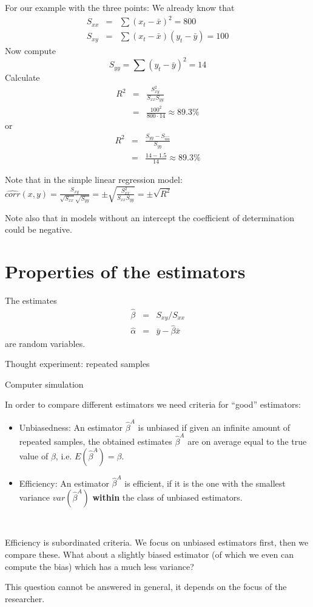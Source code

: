 \documentclass{article}
\begin{document}
For our example with the three points:
We already know that%
\begin{eqnarray*}
	S_{xx} &=&\sum \left( x_{t}-\bar{x}\right) ^{2}=800 \\
	S_{xy} &=&\sum \left( x_{t}-\bar{x}\right) \left( y_{t}-\bar{y}\right) =100
\end{eqnarray*}%
Now compute%
\[
S_{yy}=\sum \left( y_{t}-\bar{y}\right) ^{2}=14 
\]%
Calculate%
\begin{eqnarray*}
	R^{2} &=&\frac{S_{xy}^{2}}{S_{xx}S_{yy}} \\
	&=&\frac{100^{2}}{800\cdot 14}\approx 89.3\%
\end{eqnarray*}%
or%
\begin{eqnarray*}
	R^{2} &=&\frac{S_{yy}-S_{\hat{u}\hat{u}}}{S_{yy}} \\
	&=&\frac{14-1.5}{14}\approx 89.3\%
\end{eqnarray*}

Note that in the simple linear regression model: $\widehat{corr}(x,y)=\frac{S_{xy}}{\sqrt{S_{xx}}\sqrt{S_{yy}}}= \pm \sqrt{\frac{S_{xx}^2}{S_{xx}S_{yy}}} = \pm \sqrt{R^2}$

Note also that in models without an intercept the coefficient of determination could be negative.
\section{Properties of the estimators}

The estimates
\begin{eqnarray*}
\hat{\beta} &=&S_{xy}/S_{xx} \\
\hat{\alpha} &=&\bar{y}-\hat{\beta}\bar{x}
\end{eqnarray*}
are random variables.

Thought experiment: repeated samples

Computer simulation 

In order to compare different estimators we need criteria for \enquote{good} estimators:
\begin{itemize}
	\item Unbiasedness: An estimator $\hat{\beta}^A$ is unbiased if given an infinite amount of repeated samples, the obtained estimates $\hat{\beta}^A$ are on average equal to the true value of $\beta$, i.e. $E(\hat{\beta}^A)=\beta$.
	\item Efficiency: An estimator $\hat{\beta}^A$ is efficient, if it is the one with the smallest variance $var(\hat{\beta}^A)$ \textbf{within} the class of unbiased estimators.
\end{itemize}
\begin{center}
	\\
		
\end{center}
Efficiency is subordinated criteria. We focus on unbiased estimators first, then we compare these. What about a slightly biased estimator (of which we even can compute the bias) which has a much less variance?
\begin{center}
	
\end{center}
This question cannot be answered in general, it depends on the focus of the researcher.
\end{document}

